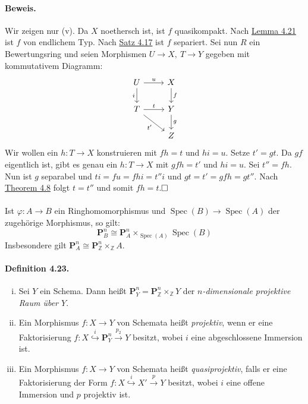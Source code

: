 \documentclass[11pt,b5paper,openany]{memoir}
\def \qed {$\hfill\square$}
\begin{document}
\paragraph{Beweis.} Wir zeigen nur (v). Da $X$ noethersch ist, ist $f$ quasikompakt. Nach \hyperref[4.21]{Lemma 4.21} ist $f$ von endlichem Typ. Nach \hyperref[4.17]{Satz 4.17} ist $f$ separiert. Sei nun $R$ ein Bewertungsring und seien Morphismen $U\to X,\ T\to Y$ gegeben mit kommutativem Diagramm:
\[\begin{tikzcd}
U \ar[r, "u"]\ar[d, "i"']& X\ar[d, "f"]\\
T\ar[r, "t"]\ar[dr, "t'"'] & Y\ar[d, "g"]\\
& Z
\end{tikzcd} \]
Wir wollen ein $h:T\to X$ konstruieren mit $fh=t$ und $hi=u$. Setze $t'=gt$. Da $gf$ eigentlich ist, gibt es genau ein $h:T\to X$ mit $gfh=t'$ und $hi=u$. Sei $t''=fh$. Nun ist $g$ separabel und $ti=fu=fhi=t''i$ und $gt=t'=gfh=gt''$. Nach \hyperref[4.8]{Theorem 4.8} folgt $t=t''$ und somit $fh=t$.\qed

\paragraph{} Ist $\varphi:A\to B$ ein Ringhomomorphismus und $\operatorname{Spec}(B)\to\operatorname{Spec}(A)$ der zugehörige Morphismus, so gilt:
\[\mathbf{P}_B^n\cong\mathbf{P}_A^n\times_{\operatorname{Spec}(A)}\operatorname{Spec}(B) \]
Insbesondere gilt $\mathbf{P}_A^n\cong\mathbf{P}_\mathbb{Z}^n\times_\mathbb{Z}A$.

\paragraph{Definition 4.23.}\label{4.23} \begin{enumerate}[(i)]
\item Sei $Y$ ein Schema. Dann heißt $\mathbf{P}_Y^n=\mathbf{P}_\mathbb{Z}^n\times_\mathbb{Z}Y$ der \textit{$n$-dimensionale projektive Raum über $Y$}.
\item Ein Morphismus $f:X\to Y$ von Schemata heißt \textit{projektiv}, wenn er eine Faktorisierung $f:X\stackrel{i}{\hookrightarrow} \mathbf{P}_Y^n\stackrel{p_2}{\to} Y$ besitzt, wobei $i$ eine abgeschlossene Immersion ist.
\item Ein Morphismus $f:X\to Y$ von Schemata heißt \textit{quasiprojektiv}, falls er eine Faktorisierung der Form $f:X\stackrel{i}{\hookrightarrow} X'\stackrel{p}{\to}Y$ besitzt, wobei $i$ eine offene Immersion und $p$ projektiv ist.
\end{enumerate}
\end{document}
